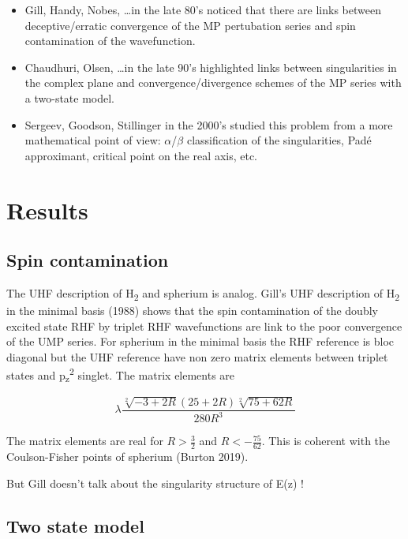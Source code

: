 \documentclass{article}
\begin{document}
\begin{itemize}
\item Gill, Handy, Nobes, \ldots in the late 80's noticed that there are links between deceptive/erratic convergence of the MP pertubation series and spin contamination of the wavefunction.

\item Chaudhuri, Olsen, \ldots in the late 90's highlighted links between singularities in the complex plane and convergence/divergence schemes of the MP series with a two-state model.

\item Sergeev, Goodson, Stillinger in the 2000's studied this problem from a more mathematical point of view: $\alpha$/$\beta$ classification of the singularities, Pad\'e approximant, critical point on the real axis, etc.
\end{itemize}

\section{Results}

\subsection{Spin contamination}
The UHF description of H\textsubscript{2} and spherium is analog. Gill's UHF description of H\textsubscript{2} in the minimal basis (1988) shows that the spin contamination of the doubly excited state RHF by triplet RHF wavefunctions are link to the poor convergence of the UMP series. 
For spherium in the minimal basis the RHF reference is bloc diagonal but the UHF reference have non zero matrix elements between triplet states and p\textsubscript{z}\textsuperscript{2} singlet. The matrix elements are

\begin{equation}
\lambda\frac{\sqrt[2]{-3+2R}(25+2R)\sqrt[2]{75+62R}}{280 R^{3}}
\end{equation}

The matrix elements are real for $R>\frac{3}{2}$ and $R<-\frac{75}{62}$. This is coherent with the Coulson-Fisher points of spherium (Burton 2019).

But Gill doesn't talk about the singularity structure of E(z) !

\subsection{Two state model}
\end{document}
